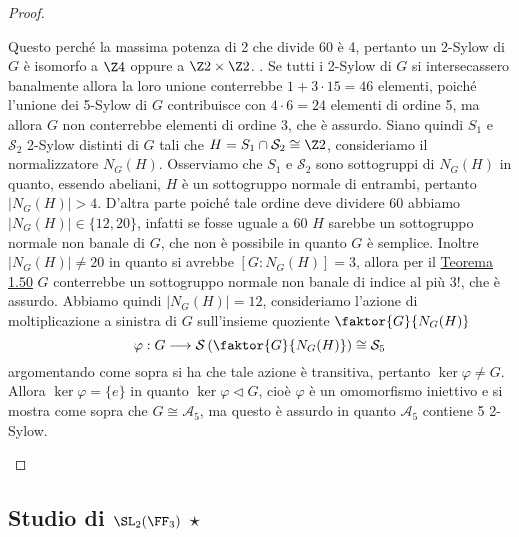 \documentclass[11pt]{scrartcl}
\begin{document}
\begin{proof}
\begin{itemize}
{				Questo perché la massima potenza di 2 che divide 60 è 4, pertanto
				un 2-Sylow di $G$ è isomorfo a $\Z4$ oppure a $\Z2\times \Z2$.
			}. Se tutti i 2-Sylow di $G$ si intersecassero banalmente allora la 
			loro unione conterrebbe $1 + 3\cdot 15 = 46$ elementi, poiché l'unione dei
			5-Sylow di $G$ contribuisce con $4\cdot 6 = 24$ elementi di ordine 5,
			ma allora $G$ non conterrebbe elementi di ordine 3, che è assurdo.
			Siano quindi $S_1$ e $\mathcal{S}_2$ 2-Sylow distinti di $G$ tali che 
			$H = S_1\cap \mathcal{S}_2 \cong \Z2$, consideriamo il normalizzatore $N_G(H)$.
			Osserviamo che $S_1$ e $\mathcal{S}_2$ sono sottogruppi di $N_G(H)$ in quanto, essendo
			abeliani, $H$ è un sottogruppo normale di entrambi, pertanto $|N_G(H)| > 4$.
			D'altra parte poiché tale ordine deve dividere 60 abbiamo 
			$|N_G(H)| \in \{12, 20\}$, infatti se fosse uguale a 60 $H$ sarebbe un 
			sottogruppo normale non banale di $G$, che non è possibile in quanto $G$
			è semplice. Inoltre $|N_G(H)| \neq 20$ in quanto si avrebbe $[G:N_G(H)] = 3$,
			allora per il \hyperref[teorema1.50]{Teorema 1.50} $G$ conterrebbe
			un sottogruppo normale non banale di indice al più $3!$, che è assurdo.
			Abbiamo quindi $|N_G(H)| = 12$, consideriamo l'azione di 
			moltiplicazione a sinistra di $G$ sull'insieme quoziente $\faktor{G}{N_G(H)}$
			\[
			\varphi : G\longrightarrow\mathcal{S}\left(\faktor{G}{N_G(H)}\right)\cong \mathcal{S}_5
			\]
			argomentando come sopra si ha che tale azione è transitiva, pertanto
			$\ker\varphi \neq G$. Allora $\ker\varphi = \{e\}$ in quanto 
			$\ker\varphi\triangleleft G$, cioè $\varphi$ è un omomorfismo iniettivo
			e si mostra come sopra che $G \cong \mathcal{A}_5$, ma questo è assurdo 
			in quanto $\mathcal{A}_5$ contiene 5 2-Sylow.
		\end{itemize}
	\end{proof}
	
	\newpage
	
	\subsection{Studio di \texorpdfstring{$\SL_2(\FF_3)$ $\star$}{SL₂(F₃) ★}}
	
\end{document}
